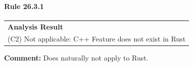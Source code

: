 \paragraph{Rule 26.3.1}
\begin{longtable}{p{13cm}}
\textbf{Analysis Result} \\
(C2) Not applicable: C++ Feature does not exist in Rust \\
\end{longtable}
\textbf{Comment:} Does naturally not apply to Rust. \\
